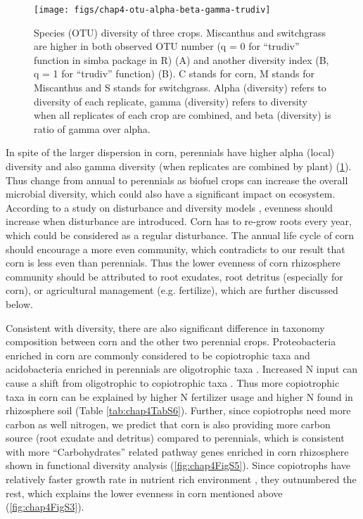 \documentclass[]{msu-thesis}
\begin{document}
\begin{figure}[tbph!]
  \centering
  \texttt{[image: figs/chap4-otu-alpha-beta-gamma-trudiv]}
  \caption[Species (OTU) diversity of three crops]{Species (OTU) diversity of three crops. Miscanthus and switchgrass are higher in both observed OTU number (q = 0 for ``trudiv'' function in simba package in R) (A) and another diversity index (B, q = 1 for ``trudiv'' function) (B). C stands for corn, M stands for Miscanthus and S stands for switchgrass. Alpha (diversity) refers to diversity of each replicate, gamma (diversity) refers to diversity when all replicates of each crop are combined, and beta (diversity) is ratio of gamma over alpha.}
  \label{fig:chap4FigS2}
\end{figure}

In spite of the larger dispersion in corn, perennials have higher alpha (local) diversity and also gamma diversity (when replicates are combined by plant) (\cref{fig:chap4FigS2}). Thus change from annual to perennials as biofuel crops can increase the overall microbial diversity, which could also have a significant impact on ecosystem. According to a study on disturbance and diversity models \cite{svensson_disturbance-diversity_2012}, evenness should increase when disturbance are introduced. Corn has to re-grow roots every year, which could be considered as a regular disturbance. The annual life cycle of corn should encourage a more even community, which contradicts to our result that corn is less even than perennials. Thus the lower evenness of corn rhizosphere community should be attributed to root exudates, root detritus (especially for corn), or agricultural management (e.g. fertilize), which are further discussed below.

Consistent with diversity, there are also significant difference in taxonomy composition between corn and the other two perennial crops. Proteobacteria enriched in corn are commonly considered to be copiotrophic taxa and acidobacteria enriched in perennials are oligotrophic taxa \cite{fierer_toward_2007,eilers_shifts_2010}. Increased N input can cause a shift from oligotrophic to copiotrophic taxa \cite{fierer_comparative_2012,wessen_differential_2010}. Thus more copiotrophic taxa in corn can be explained by higher N fertilizer usage and higher N found in rhizosphere soil (Table \ref{tab:chap4TabS6}). Further, since copiotrophs need more carbon as well nitrogen, we predict that corn is also providing more carbon source (root exudate and detritus) compared to perennials, which is consistent with more ``Carbohydrates'' related pathway genes enriched in corn rhizosphere shown in functional diversity analysis (\cref{fig:chap4FigS5}). Since copiotrophs have relatively faster growth rate in nutrient rich environment \cite{fierer_comparative_2012}, they outnumbered the rest, which explains the lower evenness in corn mentioned above (\cref{fig:chap4FigS3}).
\end{document}
